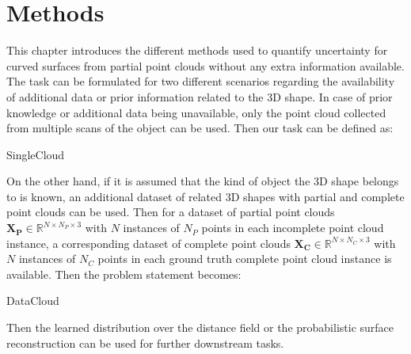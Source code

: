 \chapter{Methods}\label{ch:methods}
This chapter introduces the different methods used to quantify uncertainty for curved surfaces from partial point clouds without any extra information available. The task can be formulated for two different scenarios regarding the availability of additional data or prior information related to the 3D shape. In case of prior knowledge or additional data being unavailable, only the point cloud collected from multiple scans of the object can be used. Then our task can be defined as:
\begin{problemnotitle}{SingleCloud}{}
\end{problemnotitle}
\newline

On the other hand, if it is assumed that the kind of object the 3D shape belongs to is known, an additional dataset of related 3D shapes with partial and complete point clouds can be used. Then for a dataset of partial point clouds $\mathbf{X_P} \in \mathbb{R}^{N \times N_P \times 3}$ with $N$ instances of $N_P$ points in each incomplete point cloud instance, a corresponding dataset of complete point clouds $\mathbf{X_C} \in \mathbb{R}^{N \times N_C \times 3}$ with $N$ instances of $N_C$ points in each ground truth complete point cloud instance is available. Then the problem statement becomes:
\begin{problemnotitle}{DataCloud}{}
\end{problemnotitle}
\newline

Then the learned distribution over the distance field or the probabilistic surface reconstruction can be used for further downstream tasks.



